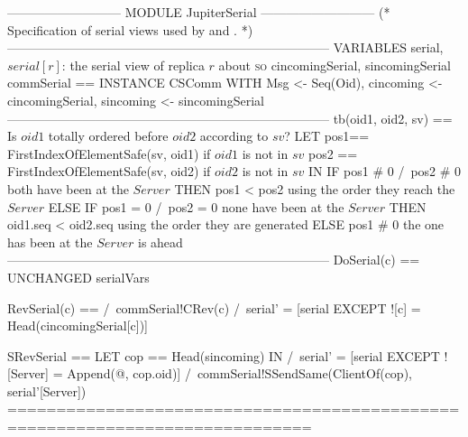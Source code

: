 \documentclass{article}
\begin{document}
\begin{tla}
--------------------------- MODULE JupiterSerial ---------------------------
(*
Specification of serial views used by \absjupiter{} and \cjupiter{}.
*)
-----------------------------------------------------------------------------
VARIABLES serial, \* $serial[r]$: the serial view of replica $r$ about \textsc{so} 
          cincomingSerial, sincomingSerial
commSerial == INSTANCE CSComm WITH Msg <- Seq(Oid), 
                cincoming <- cincomingSerial, sincoming <- sincomingSerial
-----------------------------------------------------------------------------
tb(oid1, oid2, sv) == \* Is $oid1$ totally ordered before $oid2$ according to $sv$?
    LET  pos1== FirstIndexOfElementSafe(sv, oid1)  if $oid1$ is not in $sv$
        pos2 == FirstIndexOfElementSafe(sv, oid2)  if $oid2$ is not in $sv$
    IN  IF pos1 # 0 /\ pos2 # 0 \* both have been at the $Server$
        THEN pos1 < pos2        \* using the order they reach the $Server$
        ELSE IF pos1 = 0 /\ pos2 = 0  \* none have been at the $Server$
             THEN oid1.seq < oid2.seq \* using the order they are generated
             ELSE pos1 # 0 \* the one has been at the $Server$ is ahead
-----------------------------------------------------------------------------
DoSerial(c) == UNCHANGED serialVars

RevSerial(c) ==
    /\ commSerial!CRev(c)
    /\ serial' = [serial EXCEPT ![c] = Head(cincomingSerial[c])]

SRevSerial ==
    LET cop == Head(sincoming)
    IN  /\ serial' = [serial EXCEPT ![Server] = Append(@, cop.oid)]
        /\ commSerial!SSendSame(ClientOf(cop), serial'[Server])
=============================================================================
\end{tla}
\end{document}
